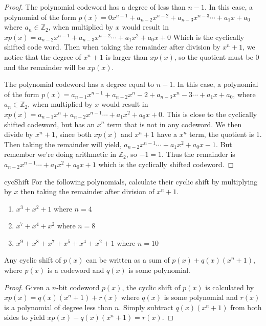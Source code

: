 \begin{proof}{}

The polynomial codeword has a degree of less than $n-1$. In this case, a polynomial of the form $p(x)= 0x^{n-1} + a_{n-2}x^{n-2} + a_{n-3}x^{n-3} \cdots + a_{1}x + a_0$ where $a_n \in \mathbb{Z}_2$, when multiplied by $x$ would result in $xp(x)=a_{n-2}x^{n-1} + a_{n-3}x^{n-2} \cdots + a_1x^2 + a_{0}x + 0$ Which is the cyclically shifted code word.  Then when taking the remainder after division by $x^n + 1$, we notice that the degree of $x^n + 1$ is larger than $xp(x)$, so the quotient must be 0 and the remainder will be $xp(x)$.

 
The polynomial codeword has a degree equal to $n-1$.  In this case, a polynomial of the form $p(x)= a_{n-1}x^{n-1} + a_{n-2}x^n-2 + a_{n-3}x^n-3 \cdots + a_{1}x + a_0$, where $a_n \in \mathbb{Z}_2$, when multiplied by $x$ would result in $xp(x)=a_{n-1}x^n + a_{n-2}x^{n-1} \cdots + a_1x^2 + a_{0}x + 0$.  This is close to the cyclically shifted codeword, but has an $x^n$ term that is not in any codeword.  We then divide by $x^n + 1$, since both $xp(x)$ and $x^n + 1$ have a $x^n$ term, the quotient is 1.  Then taking the remainder will yield, $a_{n-2}x^{n-1} \cdots + a_1x^2 + a_{0}x - 1$.  But remember we're doing arithmetic in $\mathbb{Z}_2$, so $-1 = 1$.  Thus the remainder is $a_{n-2}x^{n-1} \cdots + a_1x^2 + a_{0}x + 1$ which is the cyclically shifted codeword.
\end{proof}

\begin{exercise} {cycShift}
For the following polynomials, calculate their cyclic shift by multiplying by $x$ then taking the remainder after division of $x^n + 1$.
\begin{enumerate}[a]
\item
$x^3 + x^2 + 1$ where $n=4$
\item
$x^7 + x^4 + x^2$ where $n=8$
\item
$x^9 + x^8 + x^7 + x^5 + x^4 +x^2 + 1$ where $n=10$
\end{enumerate}
\end{exercise}

\begin{prop}\label{proposition:polycodes:cyclicsum}
Any cyclic shift of $p(x)$ can be written as a sum of $p(x) + q(x)(x^n + 1)$, where $p(x)$ is a codeword and $q(x)$ is some polynomial.  
\end{prop}

\begin{proof}
Given a $n$-bit codeword $p(x)$, the cyclic shift of $p(x)$ is calculated by $xp(x) = q(x)(x^n + 1) + r(x)$ where $q(x)$ is some polynomial and $r(x)$ is a polynomial of degree less than $n$.  Simply subtract $q(x)(x^n + 1)$ from both sides to yield $xp(x) - q(x)(x^n + 1) = r(x)$.
\end{proof}

